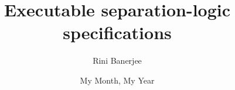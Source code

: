 \documentclass[withindex,glossary]{cam-thesis}
\title{Executable separation-logic\\
specifications}
\author{Rini Banerjee}
\date{My Month, My Year}
\begin{document}
\frontmatter{}





\end{document}
